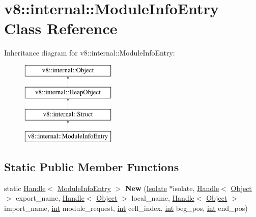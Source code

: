 \hypertarget{classv8_1_1internal_1_1ModuleInfoEntry}{}\section{v8\+:\+:internal\+:\+:Module\+Info\+Entry Class Reference}
\label{classv8_1_1internal_1_1ModuleInfoEntry}
Inheritance diagram for v8\+:\+:internal\+:\+:Module\+Info\+Entry\+:\begin{figure}[H]
\begin{center}
\leavevmode
\includegraphics[height=4.000000cm]{classv8_1_1internal_1_1ModuleInfoEntry}
\end{center}
\end{figure}
\subsection*{Static Public Member Functions}
\begin{DoxyCompactItemize}
\item 
\mbox{\label{classv8_1_1internal_1_1ModuleInfoEntry_a68b83d95529fd5dc190362c6b7563dda}} 
static \mbox{\hyperlink{classv8_1_1internal_1_1Handle}{Handle}}$<$ \mbox{\hyperlink{classv8_1_1internal_1_1ModuleInfoEntry}{Module\+Info\+Entry}} $>$ {\bfseries New} (\mbox{\hyperlink{classv8_1_1internal_1_1Isolate}{Isolate}} $\ast$isolate, \mbox{\hyperlink{classv8_1_1internal_1_1Handle}{Handle}}$<$ \mbox{\hyperlink{classv8_1_1internal_1_1Object}{Object}} $>$ export\+\_\+name, \mbox{\hyperlink{classv8_1_1internal_1_1Handle}{Handle}}$<$ \mbox{\hyperlink{classv8_1_1internal_1_1Object}{Object}} $>$ local\+\_\+name, \mbox{\hyperlink{classv8_1_1internal_1_1Handle}{Handle}}$<$ \mbox{\hyperlink{classv8_1_1internal_1_1Object}{Object}} $>$ import\+\_\+name, \mbox{\hyperlink{classint}{int}} module\+\_\+request, \mbox{\hyperlink{classint}{int}} cell\+\_\+index, \mbox{\hyperlink{classint}{int}} beg\+\_\+pos, \mbox{\hyperlink{classint}{int}} end\+\_\+pos)
\end{DoxyCompactItemize}
